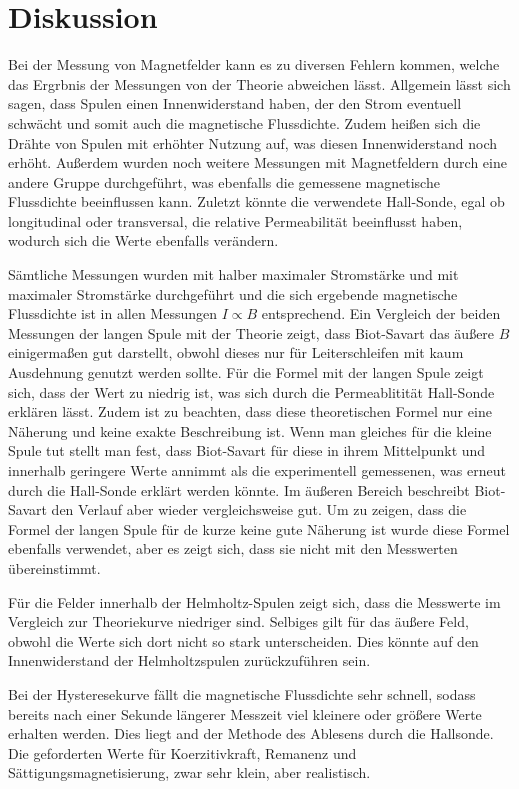 \section{Diskussion}
\label{sec:Diskussion}

Bei der Messung von Magnetfelder kann es zu diversen Fehlern kommen, welche das Ergrbnis
der Messungen von der Theorie abweichen lässt.
Allgemein lässt sich sagen, dass Spulen einen Innenwiderstand haben, der den Strom eventuell
schwächt und somit auch die magnetische Flussdichte. Zudem heißen sich die Drähte
von Spulen mit erhöhter Nutzung auf, was diesen Innenwiderstand noch erhöht.
Außerdem wurden noch weitere Messungen mit Magnetfeldern durch eine andere Gruppe
durchgeführt, was ebenfalls die gemessene magnetische Flussdichte beeinflussen kann.
Zuletzt könnte die verwendete Hall-Sonde, egal ob longitudinal oder transversal, die
relative Permeabilität beeinflusst haben, wodurch sich die Werte ebenfalls verändern.

Sämtliche Messungen wurden mit halber maximaler Stromstärke und mit maximaler Stromstärke durchgeführt und die
sich ergebende magnetische Flussdichte ist in allen Messungen $ I \propto B$ entsprechend.
Ein Vergleich der beiden Messungen der langen Spule mit der Theorie zeigt, dass
Biot-Savart das äußere $B$ einigermaßen gut darstellt, obwohl dieses nur für Leiterschleifen
mit kaum Ausdehnung genutzt werden sollte.  Für die Formel mit der langen Spule zeigt sich, dass
der Wert zu niedrig ist, was sich durch die Permeablitität Hall-Sonde erklären lässt. Zudem ist zu beachten,
dass diese theoretischen Formel nur eine Näherung und keine exakte Beschreibung ist.
Wenn man gleiches für die kleine Spule tut stellt man fest, dass Biot-Savart für diese
in ihrem Mittelpunkt und innerhalb geringere Werte annimmt als die experimentell gemessenen, was erneut durch die Hall-Sonde
erklärt werden könnte. Im äußeren Bereich beschreibt Biot-Savart den Verlauf aber wieder vergleichsweise gut.
Um zu zeigen, dass die Formel der langen Spule für de kurze keine gute Näherung ist
wurde diese Formel ebenfalls verwendet, aber es zeigt sich, dass sie nicht mit den Messwerten übereinstimmt.

Für die Felder innerhalb der Helmholtz-Spulen zeigt sich, dass die Messwerte im Vergleich
zur Theoriekurve niedriger sind. Selbiges gilt für das äußere Feld, obwohl die Werte sich dort nicht
so stark unterscheiden. Dies könnte auf den Innenwiderstand der Helmholtzspulen zurückzuführen sein.

Bei der Hysteresekurve fällt die magnetische Flussdichte sehr schnell, sodass bereits nach einer Sekunde längerer
Messzeit viel kleinere oder größere Werte erhalten werden. Dies liegt and der Methode des Ablesens durch die Hallsonde.
Die geforderten Werte für Koerzitivkraft, Remanenz und Sättigungsmagnetisierung, zwar sehr klein, aber  realistisch.
